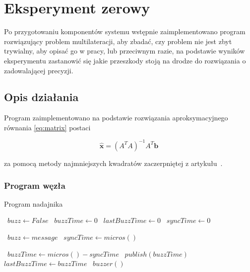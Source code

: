 \chapter{Eksperyment zerowy}

Po przygotowaniu komponentów systemu wstępnie zaimplementowano program rozwiązujący problem multilateracji, aby zbadać, czy problem nie jest zbyt trywialny, aby opisać go w pracy, lub przeciwnym razie, na podstawie wyników eksperymentu zastanowić się jakie przeszkody stoją na drodze do rozwiązania o zadowalającej precyzji.

\section{Opis działania}

Program zaimplementowano na podstawie rozwiązania aproksymacyjnego równania \ref{eq:matrix} postaci

\begin{equation}
    \label{eq:lls}
    \hat{\boldsymbol{x}} = {\left(A^T A\right)}^{-1} A^T \boldsymbol{b}
\end{equation}

za pomocą metody najmniejszych kwadratów zaczerpniętej z artykułu~\cite{norrdine2012algebraic}.

\subsection{Program węzła}

\begin{algorithm}
\caption{Program nadajnika}\label{alg:source}
\begin{algorithmic}[1]
    \State\ $buzz \gets False$
    \State\ $buzzTime \gets 0$
    \State\ $lastBuzzTime \gets 0$
    \State\ $syncTime \gets 0$

            \State\ $buzz \gets message$
        \EndIf
            \State\ $syncTime \gets micros()$
        \EndIf
    \EndFunction

    \Loop
            \State\ $buzzTime \gets micros() - syncTime$
            \State\ $publish(buzzTime)$
            \State\ $lastBuzzTime \gets buzzTime$
            \State\ $buzzer()$
        \EndIf
    \EndLoop
\end{algorithmic}
\end{algorithm}

